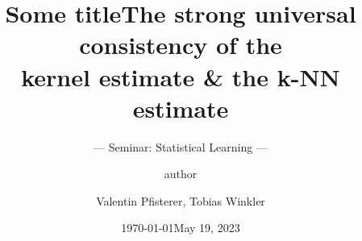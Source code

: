 \documentclass[%
	]{beamer}   			%
\title{Some title}
\author{author}
\institute{University of Tübingen}
\date{\today}
\newcommand{\authors}{Valentin Pfisterer, Tobias Winkler}
\begin{document}
\title{The strong universal consistency of the \\ kernel estimate \& the k-NN estimate}
\subtitle{--- Seminar: Statistical Learning ---}
\author{\authors{}}
\date{May 19, 2023} %


\frame{\titlepage}





\end{document}
